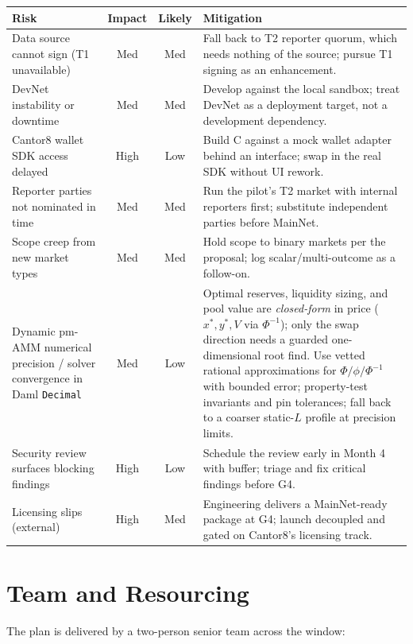 \documentclass[11pt,a4paper]{article}
\begin{document}
\renewcommand{\arraystretch}{1.2}
\begin{center}
\begin{tabularx}{\linewidth}{Y c c Y}
\toprule
\textbf{Risk} & \textbf{Impact} & \textbf{Likely} & \textbf{Mitigation} \\
\midrule
Data source cannot sign (T1 unavailable) & Med & Med & Fall back to T2 reporter quorum, which needs nothing of the source; pursue T1 signing as an enhancement. \\
DevNet instability or downtime & Med & Med & Develop against the local sandbox; treat DevNet as a deployment target, not a development dependency. \\
Cantor8 wallet SDK access delayed & High & Low & Build C against a mock wallet adapter behind an interface; swap in the real SDK without UI rework. \\
Reporter parties not nominated in time & Med & Med & Run the pilot's T2 market with internal reporters first; substitute independent parties before MainNet. \\
Scope creep from new market types & Med & Med & Hold scope to binary markets per the proposal; log scalar/multi-outcome as a follow-on. \\
Dynamic pm-AMM numerical precision / solver convergence in Daml \texttt{Decimal} & Med & Low & Optimal reserves, liquidity sizing, and pool value are \emph{closed-form} in price ($x^*,y^*,V$ via $\Phi^{-1}$); only the swap direction needs a guarded one-dimensional root find. Use vetted rational approximations for $\Phi/\phi/\Phi^{-1}$ with bounded error; property-test invariants and pin tolerances; fall back to a coarser static-$L$ profile at precision limits. \\
Security review surfaces blocking findings & High & Low & Schedule the review early in Month 4 with buffer; triage and fix critical findings before G4. \\
Licensing slips (external) & High & Med & Engineering delivers a MainNet-ready package at G4; launch decoupled and gated on Cantor8's licensing track. \\
\bottomrule
\end{tabularx}
\end{center}

\section{Team and Resourcing}
\label{sec:resourcing}

The plan is delivered by a two-person senior team across the window:
\end{document}
